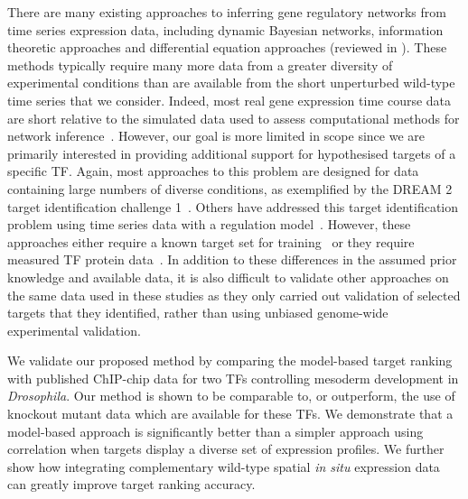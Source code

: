 \documentclass{pnastwo}
\begin{document}
\begin{article}
There are many existing approaches to inferring gene regulatory networks from
time series expression data, including dynamic Bayesian networks,
information theoretic approaches and differential equation approaches
(reviewed in \cite{Bansal2007a}). These methods typically require many
more data from a greater diversity of experimental conditions than are
available from the short unperturbed wild-type time series that we
consider. Indeed, most real gene expression time course data are short
relative to the simulated data used to assess computational methods
for network inference~\cite{Ernst2005}. However, our goal is more limited in scope since
we are primarily interested in providing additional support for hypothesised
targets of a specific TF. Again, most approaches to this problem are
designed for data containing large numbers of diverse conditions, as
exemplified by the DREAM 2 target identification
challenge 1~\cite{Stolovitzky2007}. Others
have addressed this target identification problem using time series
data with a regulation model~\cite{Barenco2006a,Gatta2008}. However,
these approaches either require a known target set for training~\cite{Barenco2006a} or
they require measured TF protein data~\cite{Gatta2008}. In addition to
these differences in the assumed prior knowledge and available data,
it is also difficult to validate other approaches on the same data used in these
studies as they only carried out validation of selected targets
that they identified, rather than using unbiased genome-wide
experimental validation. 

We validate our proposed method by comparing the model-based target
ranking with published ChIP-chip data for two TFs controlling
mesoderm development in \emph{Drosophila}. Our method is shown to be comparable
to, or outperform, the use of knockout mutant data which are available
for these TFs. We demonstrate that a model-based approach is significantly
better than a simpler approach using correlation when targets display a diverse set of expression profiles. We further show how integrating complementary wild-type spatial
{\em in situ} expression data can greatly improve target ranking accuracy. 


\end{article}
\end{document}
